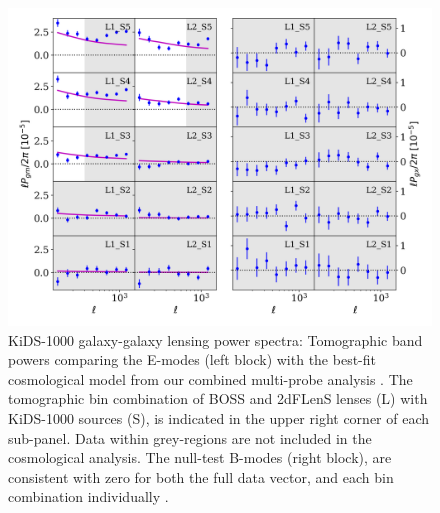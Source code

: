 \begin{figure}
        \includegraphics[width=\textwidth]{Data_Plots/Pgk/Pgk_K1000_2Dbins_v2_goldclasses_Flag_SOM_Fid_A.png}
        \caption{KiDS-1000 galaxy-galaxy lensing power spectra:
          Tomographic band powers comparing the E-modes (left block)
          with the best-fit
          cosmological model from our combined multi-probe analysis
          .  The tomographic 
        bin combination of BOSS and 2dFLenS lenses (L) with KiDS-1000
        sources (S), is indicated in the upper right corner of each
        sub-panel.  Data within grey-regions are not included in the cosmological analysis.
        The null-test B-modes (right block), are
      consistent with zero for both the full data vector, and each
     bin combination individually .}
        \label{fig:Pgk}
\end{figure}



